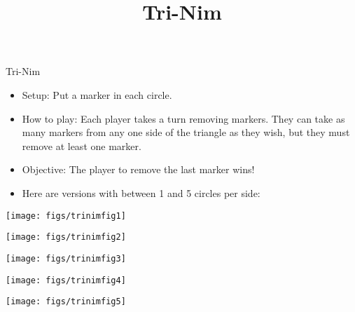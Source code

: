 \documentclass[12pt]{report}
\title{Tri-Nim}
\begin{document}
\thispagestyle{empty}

\begin{center}
  \Huge{Tri-Nim}
\end{center}

\begin{itemize}
\item Setup: Put a marker in each circle.
\item How to play: Each player takes a turn removing markers.  They
  can take as many markers from any one side of the triangle as they
  wish, but they must remove at least one marker.
\item Objective: The player to remove the last marker wins!
\item Here are versions with between 1 and 5 circles per side:
\end{itemize}

\begin{multicols}{2}

  \begin{center}
    \texttt{[image: figs/trinimfig1]}
  \end{center}

  \begin{center}
    \texttt{[image: figs/trinimfig2]}
  \end{center}

  \begin{center}
    \texttt{[image: figs/trinimfig3]}
  \end{center}

  \begin{center}
    \texttt{[image: figs/trinimfig4]}
  \end{center}

  \begin{center}
    \texttt{[image: figs/trinimfig5]}
  \end{center}

\end{multicols}
\end{document}
